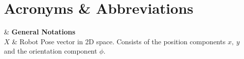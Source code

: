 %
\chapter*{Acronyms \& Abbreviations}

\begin{acronym}[AAAAAA]
\end{acronym}


\cleardoublepage %

 {

& \textbf{General Notations} \\

$X$ & Robot Pose vector in 2D space. Consists of the position components $x,\ y$ and the orientation component $\phi$. \\


}
